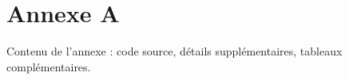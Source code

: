 \chapter{Annexe A}
\label{annexe:a}

Contenu de l'annexe : code source, détails supplémentaires, tableaux complémentaires.